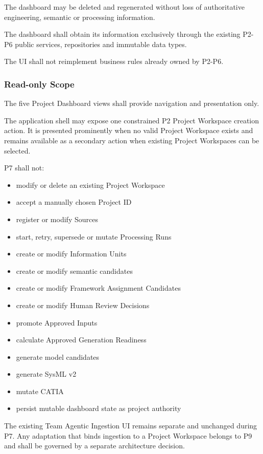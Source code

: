 The dashboard may be deleted and regenerated without loss of authoritative engineering, semantic or processing information.

The dashboard shall obtain its information exclusively through the existing P2-P6 public services, repositories and immutable data types.

The UI shall not reimplement business rules already owned by P2-P6.

\hypertarget{read-only-scope}{%
\subsubsection{Read-only Scope}\label{read-only-scope}}

The five Project Dashboard views shall provide navigation and presentation only.

The application shell may expose one constrained P2 Project Workspace creation action. It is presented prominently when no valid Project Workspace exists and remains available as a secondary action when existing Project Workspaces can be selected.

P7 shall not:

\begin{itemize}
\tightlist
\item
  modify or delete an existing Project Workspace
\item
  accept a manually chosen Project ID
\item
  register or modify Sources
\item
  start, retry, supersede or mutate Processing Runs
\item
  create or modify Information Units
\item
  create or modify semantic candidates
\item
  create or modify Framework Assignment Candidates
\item
  create or modify Human Review Decisions
\item
  promote Approved Inputs
\item
  calculate Approved Generation Readiness
\item
  generate model candidates
\item
  generate SysML v2
\item
  mutate CATIA
\item
  persist mutable dashboard state as project authority
\end{itemize}

The existing Team Agentic Ingestion UI remains separate and unchanged during P7. Any adaptation that binds ingestion to a Project Workspace belongs to P9 and shall be governed by a separate architecture decision.

